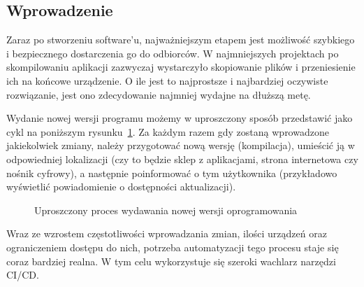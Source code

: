 \subsection{Wprowadzenie}
Zaraz po stworzeniu software'u, najważniejszym etapem jest możliwość szybkiego i bezpiecznego dostarczenia go do odbiorców.
W najmniejszych projektach po skompilowaniu aplikacji zazwyczaj wystarczyło skopiowanie plików
i przeniesienie ich na końcowe urządzenie. O ile jest to najprostsze i najbardziej oczywiste rozwiązanie,
jest ono zdecydowanie najmniej wydajne na dłuższą metę.

Wydanie nowej wersji programu możemy w uproszczony sposób przedstawić jako cykl na poniższym rysunku~\ref{fig:cyklZmian}.
Za każdym razem gdy zostaną wprowadzone jakiekolwiek zmiany, należy przygotować nową wersję (kompilacja),
umieścić ją w odpowiedniej lokalizacji (czy to będzie sklep z aplikacjami, strona internetowa czy nośnik cyfrowy),
a następnie poinformować o tym użytkownika (przykładowo wyświetlić powiadomienie o dostępności aktualizacji).


\begin{figure}[!htp]
    \centering
    \caption{Uproszczony proces wydawania nowej wersji oprogramowania}
    \label{fig:cyklZmian}
\end{figure}

Wraz ze wzrostem częstotliwości wprowadzania zmian, ilości urządzeń oraz ograniczeniem dostępu do nich,
potrzeba automatyzacji tego procesu staje się coraz bardziej realna. 
W tym celu wykorzystuje się szeroki wachlarz narzędzi CI/CD. \todo{}